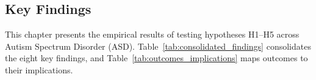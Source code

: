\subsection{Key Findings}

This chapter presents the empirical results of testing hypotheses H1--H5 across Autism Spectrum Disorder (ASD). Table~\ref{tab:consolidated_findings} consolidates the eight key findings, and Table~\ref{tab:outcomes_implications} maps outcomes to their implications.

